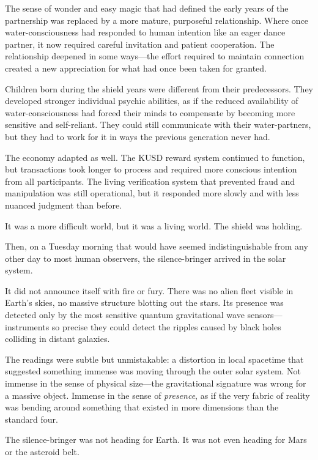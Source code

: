 The sense of wonder and easy magic that had defined the early years of the partnership was replaced by a more mature, purposeful relationship. Where once water-consciousness had responded to human intention like an eager dance partner, it now required careful invitation and patient cooperation. The relationship deepened in some ways—the effort required to maintain connection created a new appreciation for what had once been taken for granted.

Children born during the shield years were different from their predecessors. They developed stronger individual psychic abilities, as if the reduced availability of water-consciousness had forced their minds to compensate by becoming more sensitive and self-reliant. They could still communicate with their water-partners, but they had to work for it in ways the previous generation never had.

The economy adapted as well. The KUSD reward system continued to function, but transactions took longer to process and required more conscious intention from all participants. The living verification system that prevented fraud and manipulation was still operational, but it responded more slowly and with less nuanced judgment than before.

It was a more difficult world, but it was a living world. The shield was holding.

Then, on a Tuesday morning that would have seemed indistinguishable from any other day to most human observers, the silence-bringer arrived in the solar system.

It did not announce itself with fire or fury. There was no alien fleet visible in Earth's skies, no massive structure blotting out the stars. Its presence was detected only by the most sensitive quantum gravitational wave sensors—instruments so precise they could detect the ripples caused by black holes colliding in distant galaxies.

The readings were subtle but unmistakable: a distortion in local spacetime that suggested something immense was moving through the outer solar system. Not immense in the sense of physical size—the gravitational signature was wrong for a massive object. Immense in the sense of \textit{presence}, as if the very fabric of reality was bending around something that existed in more dimensions than the standard four.

The silence-bringer was not heading for Earth. It was not even heading for Mars or the asteroid belt.

